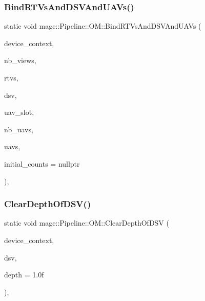\subsubsection{\texorpdfstring{Bind\+R\+T\+Vs\+And\+D\+S\+V\+And\+U\+A\+Vs()}{BindRTVsAndDSVAndUAVs()}}
{\footnotesize\ttfamily static void mage\+::\+Pipeline\+::\+O\+M\+::\+Bind\+R\+T\+Vs\+And\+D\+S\+V\+And\+U\+A\+Vs (\begin{DoxyParamCaption}\item[{I\+D3\+D11\+Device\+Context2 $\ast$}]{device\+\_\+context,  }\item[{\hyperlink{namespacemage_af2b398bf98eb10351f49cad73fe2cc73}{u32}}]{nb\+\_\+views,  }\item[{I\+D3\+D11\+Render\+Target\+View $\ast$const $\ast$}]{rtvs,  }\item[{I\+D3\+D11\+Depth\+Stencil\+View $\ast$}]{dsv,  }\item[{\hyperlink{namespacemage_af2b398bf98eb10351f49cad73fe2cc73}{u32}}]{uav\+\_\+slot,  }\item[{\hyperlink{namespacemage_af2b398bf98eb10351f49cad73fe2cc73}{u32}}]{nb\+\_\+uavs,  }\item[{I\+D3\+D11\+Unordered\+Access\+View $\ast$const $\ast$}]{uavs,  }\item[{const \hyperlink{namespacemage_af2b398bf98eb10351f49cad73fe2cc73}{u32} $\ast$}]{initial\+\_\+counts = {\ttfamily nullptr} }\end{DoxyParamCaption})\hspace{0.3cm}{\ttfamily [static]}, {\ttfamily [noexcept]}}

\hypertarget{structmage_1_1_pipeline_1_1_o_m_a741219a99680aec5adfa71deea327ef2}{}\label{structmage_1_1_pipeline_1_1_o_m_a741219a99680aec5adfa71deea327ef2} 
\subsubsection{\texorpdfstring{Clear\+Depth\+Of\+D\+S\+V()}{ClearDepthOfDSV()}}
{\footnotesize\ttfamily static void mage\+::\+Pipeline\+::\+O\+M\+::\+Clear\+Depth\+Of\+D\+SV (\begin{DoxyParamCaption}\item[{I\+D3\+D11\+Device\+Context2 $\ast$}]{device\+\_\+context,  }\item[{I\+D3\+D11\+Depth\+Stencil\+View $\ast$}]{dsv,  }\item[{\hyperlink{namespacemage_a6a44ad388483959dc4dff9f2aef91431}{f32}}]{depth = {\ttfamily 1.0f} }\end{DoxyParamCaption})\hspace{0.3cm}{\ttfamily [static]}, {\ttfamily [noexcept]}}

